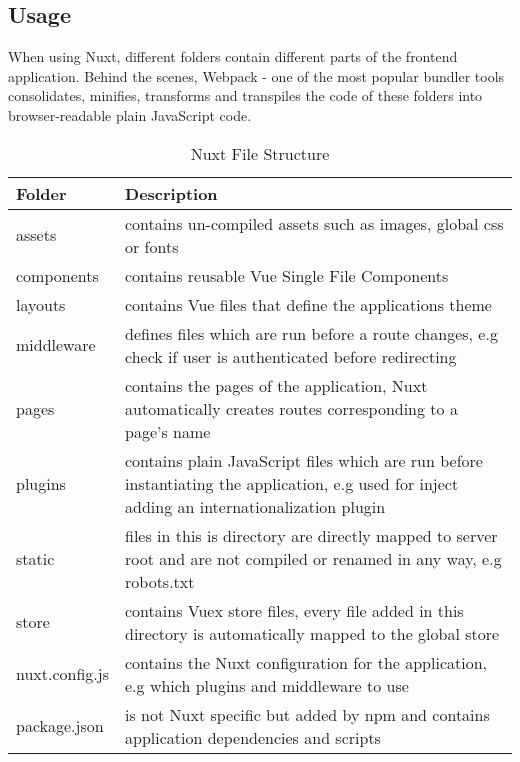 \subsection{Usage}
When using Nuxt, different folders contain different parts of the frontend application. Behind the scenes, Webpack - one of the most popular bundler tools consolidates, minifies, transforms and transpiles the code of these folders into browser-readable plain JavaScript code. 

\begin{table}
    \begin{tabularx}{\linewidth}{|l|X|}
        \hline
        \textbf{Folder} & \textbf{Description} \\
        \hline
        assets & contains un-compiled assets such as images, global css or fonts  \\
        \hline
        components & contains reusable Vue Single File Components \\
        \hline
        layouts & contains Vue files that define the applications theme \\
        \hline
        middleware & defines files which are run before a route changes, e.g check if user is authenticated before redirecting \\
        \hline
        pages & contains the pages of the application, Nuxt automatically creates routes corresponding to a page's name \\
        \hline
        plugins & contains plain JavaScript files which are run before instantiating the application, e.g used for inject adding an internationalization plugin \\
        \hline
        static & files in this is directory are directly mapped to server root and are not compiled or renamed in any way, e.g robots.txt \\
        \hline
        store & contains Vuex store files, every file added in this directory is automatically mapped to the global store \\
        \hline
        nuxt.config.js & contains the Nuxt configuration for the application, e.g which plugins and middleware to use\\
        \hline
        package.json & is not Nuxt specific but added by npm and contains application dependencies and scripts \\
        \hline
    \end{tabularx}
    \caption{Nuxt File Structure}
    \label{table:filestructure}
\end{table}

